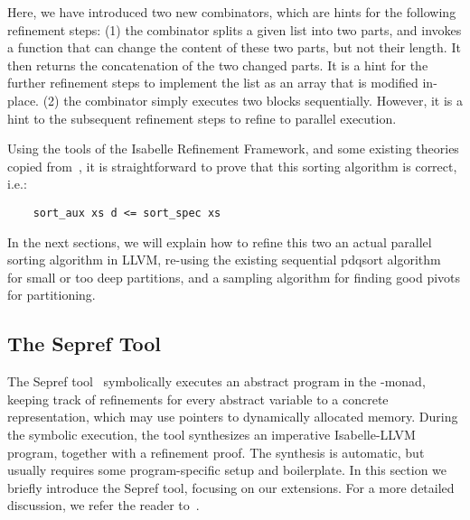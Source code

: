 \documentclass[runningheads]{llncs}
\begin{document}
  Here, we have introduced two new combinators,
  which are hints for the following refinement steps: (1) the  combinator splits a given list into two parts,
  and invokes a function that can change the content of these two parts, but not their length. It then returns
  the concatenation of the two changed parts. It is a hint for the further refinement steps to implement the list as
  an array that is modified in-place. (2) the  combinator simply executes two blocks sequentially.
  However, it is a hint to the subsequent refinement steps to refine to parallel execution.

  Using the tools of the Isabelle Refinement Framework, and some existing theories copied from~\cite{La19-llvm},
  it is straightforward to prove that this sorting algorithm is correct, i.e.:
  \begin{lstlisting}
    sort_aux xs d <= sort_spec xs
  \end{lstlisting}

  In the next sections, we will explain how to refine this two an actual parallel sorting algorithm in LLVM,
  re-using the existing sequential pdqsort algorithm~\cite{La19-llvm} for small or too deep partitions, and a sampling algorithm for finding good pivots for partitioning.

  \subsection{The Sepref Tool}
  The Sepref tool~\cite{La15,La19-llvm} symbolically executes an abstract program in the -monad,
  keeping track of refinements for every abstract variable to a concrete representation, which may use pointers to dynamically allocated memory.
  During the symbolic execution, the tool synthesizes an imperative Isabelle-LLVM program, together with a refinement proof.
  The synthesis is automatic, but usually requires some program-specific setup and boilerplate.
  In this section we briefly introduce the Sepref tool, focusing on our extensions.
  For a more detailed discussion, we refer the reader to~\cite{La15,La19-llvm}.
\end{document}
